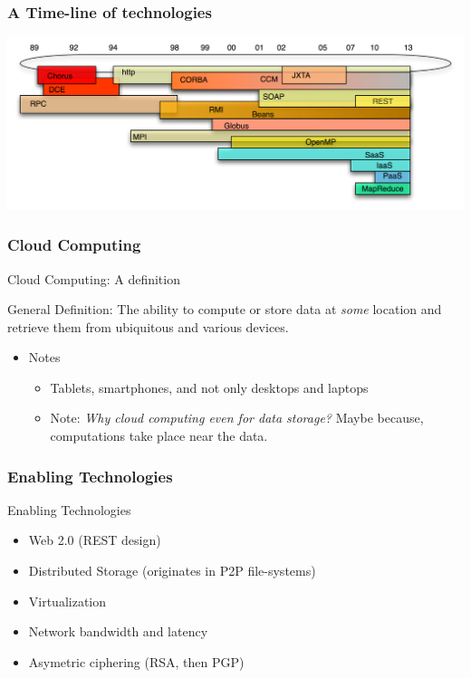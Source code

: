 \documentclass[bigger,hyperref={colorlinks=true, urlcolor=red, plainpages=false, pdfpagelabels, bookmarksnumbered}]{beamer}
\begin{document}
\begin{frame}
\frametitle{A Time-line of technologies}
\label{sec-1-3}

  \includegraphics[width=.8\linewidth]{../img/timeline.png}
\end{frame}
\begin{frame}
\frametitle{Cloud Computing}
\label{sec-1-4}
\begin{block}{Cloud Computing: A definition}
\label{sec-1-4-1}

    General Definition: The ability to compute or store data at \emph{some} location 
    and retrieve them from ubiquitous and various devices.
  
\end{block}
\begin{itemize}

\item Notes
\label{sec-1-4-2}%
\begin{itemize}
\item Tablets, smartphones, and not only desktops and laptops
\item Note: \emph{Why cloud computing even for data storage?} Maybe because, computations take place near the data.
\end{itemize}

\end{itemize} %
\end{frame}
\begin{frame}
\frametitle{Enabling Technologies}
\label{sec-1-5}
\begin{block}{Enabling Technologies}
\label{sec-1-5-1}

\begin{itemize}
\item Web 2.0 (REST design)
\item Distributed Storage (originates in P2P file-systems)
\item Virtualization
\item Network bandwidth and latency
\item Asymetric ciphering (RSA, then PGP)
\end{itemize}
      
\end{block}
\end{frame}
\end{document}
